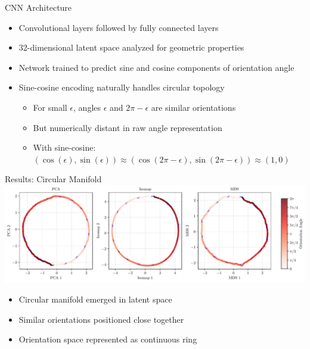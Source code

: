 \documentclass[aspectratio=169]{beamer}
\begin{document}
\begin{frame}{CNN Architecture}
    \begin{itemize}
        \item Convolutional layers followed by fully connected layers
        \item 32-dimensional latent space analyzed for geometric properties
        \item Network trained to predict sine and cosine components of orientation angle
        \item Sine-cosine encoding naturally handles circular topology
        \begin{itemize}
            \item For small $\epsilon$, angles $\epsilon$ and $2\pi - \epsilon$ are similar orientations
            \item But numerically distant in raw angle representation
            \item With sine-cosine: $(\cos(\epsilon), \sin(\epsilon)) \approx (\cos(2\pi-\epsilon), \sin(2\pi - \epsilon)) \approx (1, 0)$
        \end{itemize}
    \end{itemize}
\end{frame}

\begin{frame}{Results: Circular Manifold}
    \centering
    \includegraphics[width=\linewidth]{results/dim_reduction_combined.pdf}
    \vspace{0.3cm}
    \begin{itemize}
        \item Circular manifold emerged in latent space
        \item Similar orientations positioned close together
        \item Orientation space represented as continuous ring
    \end{itemize}
\end{frame}
\end{document}
